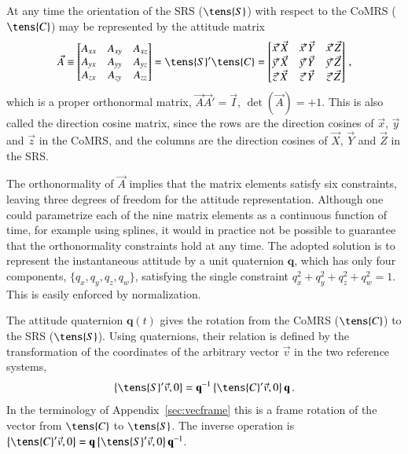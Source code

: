 \documentclass[structabstract]{aa}
\newcommand{\quat}[1]{\mathbf{#1}}
\begin{document}
At any time the orientation of the SRS ($\tens{S}$) with respect to the 
CoMRS ($\tens{C}$) may be represented by the attitude matrix
\begin{equation}\label{eq:attmat}
\vec{A} \equiv
\begin{bmatrix}
A_{xx} & A_{xy} & A_{xz} \\
A_{yx} & A_{yy} & A_{yz} \\
A_{zx} & A_{zy} & A_{zz}
\end{bmatrix}
= \tens{S}'\tens{C} =
\begin{bmatrix}
\vec{x}'\vec{X} & \vec{x}'\vec{Y} & \vec{x}'\vec{Z} \\
\vec{y}'\vec{X} & \vec{y}'\vec{Y} & \vec{y}'\vec{Z} \\
\vec{z}'\vec{X} & \vec{z}'\vec{Y} & \vec{z}'\vec{Z}
\end{bmatrix} \, ,
\end{equation}
which is a proper orthonormal matrix, $\vec{A}\vec{A}'=\vec{I}$,
$\det(\vec{A})=+1$. This is also called the direction cosine matrix,
since the rows are the direction cosines of $\vec{x}$, $\vec{y}$ and
$\vec{z}$ in the CoMRS, and the columns are the direction cosines of
$\vec{X}$, $\vec{Y}$ and $\vec{Z}$ in the SRS.

The orthonormality of $\vec{A}$ implies that the matrix elements
satisfy six constraints, leaving three degrees of freedom for the
attitude representation. Although one could parametrize each of
the nine matrix elements as a continuous function of time, for example
using splines, it would in practice not be possible to guarantee
that the orthonormality constraints hold at any time. The adopted solution 
is to represent the instantaneous attitude by a unit quaternion $\quat{q}$,
which has only four components, $\bigl\{q_x, q_y, q_z, q_w \bigr\}$, satisfying
the single constraint $q_x^2+q_y^2+q_z^2+q_w^2=1$. This is
easily enforced by normalization. 

The attitude quaternion $\quat{q}(t)$ gives the rotation from the CoMRS
($\tens{C}$) to the SRS ($\tens{S}$). Using quaternions, their relation 
is defined by the transformation of the coordinates of the arbitrary vector 
$\vec{v}$ in the two reference systems, 
\begin{equation}\label{eq:att-q}
\left\{ \tens{S}'\vec{v}, 0 \right\} = \quat{q}^{-1}
\left\{ \tens{C}'\vec{v}, 0 \right\} \quat{q} \, .
\end{equation} 
In the terminology of Appendix~\ref{sec:vecframe} this is a frame
rotation of the vector from $\tens{C}$ to $\tens{S}$. 
The inverse operation is $\left\{ \tens{C}'\vec{v}, 0 \right\} = \quat{q}
\left\{ \tens{S}'\vec{v}, 0 \right\} \quat{q}^{-1}$.
\end{document}
